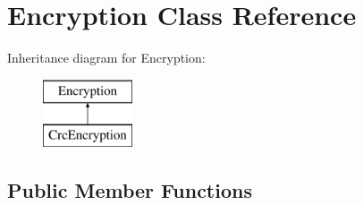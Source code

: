 \hypertarget{class_encryption}{}\section{Encryption Class Reference}
\label{class_encryption}
Inheritance diagram for Encryption\+:\begin{figure}[H]
\begin{center}
\leavevmode
\includegraphics[height=2.000000cm]{class_encryption}
\end{center}
\end{figure}
\subsection*{Public Member Functions}
